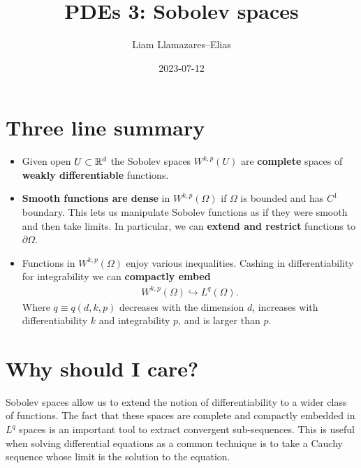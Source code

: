 \documentclass[
    a4paper,
    DIV=14,
    abstract=true,
    numbers=noenddot
]{scrartcl}
\begin{document}
\title{PDEs 3: Sobolev spaces}
\author{Liam Llamazares--Elias}
\date{2023-07-12}
\maketitle
\section{ Three line summary}
\begin{itemize}
	\item Given open $U \subset \mathbb{R}^d$ the Sobolev spaces $W^{k,p}(U)$ are \textbf{complete} spaces of \textbf{ weakly differentiable} functions.
	\item \textbf{Smooth functions are dense} in  $W^{k,p}(\Omega)$ if $\Omega$  is bounded and has $C^1$ boundary. This lets us manipulate Sobolev functions as if they were smooth and then take limits. In particular, we can \textbf{extend and restrict} functions to $\partial \Omega$.
	\item Functions in $W^{k,p}(\Omega)$ enjoy various inequalities. Cashing in differentiability for integrability we can \textbf{compactly embed}
	      \begin{align*}
		      W^{k,p}(\Omega) \hookrightarrow L^q(\Omega).
	      \end{align*}
	      Where $q\equiv q(d,k,p)$ decreases with the dimension $d$, increases with differentiability $k$ and integrability $p$, and is larger than $p$.
\end{itemize}
\section{Why should I care?}
Sobolev spaces allow us to extend the notion of differentiability to a wider class of functions. The fact that these spaces are complete and compactly embedded in $L^q$ spaces is an important tool to extract convergent sub-sequences. This is useful when solving differential equations as a common technique is to take a Cauchy sequence whose limit is the solution to the equation.
\end{document}
